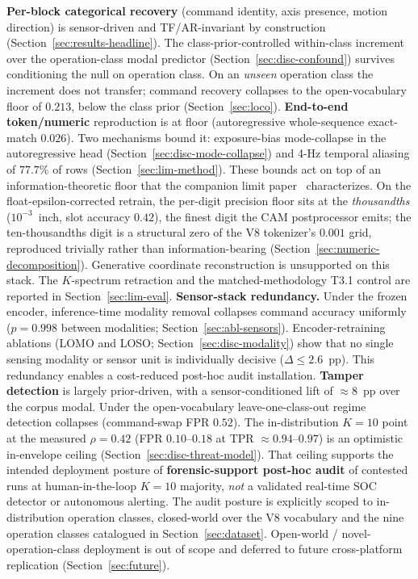 \documentclass[sensors,article,submit,moreauthors,pdftex]{Definitions/mdpi}
\begin{document}
\begin{enumerate}[label=(\arabic*), leftmargin=*, itemsep=2pt]\let\item\olditem
\item \textbf{Per-block categorical recovery} (command identity, axis presence, motion direction) is sensor-driven and TF/AR-invariant by construction (Section~\ref{sec:results-headline}). The class-prior-controlled within-class increment over the operation-class modal predictor (Section~\ref{sec:disc-confound}) survives conditioning the null on operation class. On an \emph{unseen} operation class the increment does not transfer; command recovery collapses to the open-vocabulary floor of $0.213$, below the class prior (Section~\ref{sec:loco}).
\item \textbf{End-to-end token/numeric} reproduction is at floor (autoregressive whole-sequence exact-match $0.026$). Two mechanisms bound it: exposure-bias mode-collapse in the autoregressive head (Section~\ref{sec:disc-mode-collapse}) and 4-Hz temporal aliasing of $77.7\%$ of rows (Section~\ref{sec:lim-method}). These bounds act on top of an information-theoretic floor that the companion limit paper~\cite{paperB_entropy} characterizes. On the float-epsilon-corrected retrain, the per-digit precision floor sits at the \emph{thousandths} ($10^{-3}$~inch, slot accuracy $0.42$), the finest digit the CAM postprocessor emits; the ten-thousandths digit is a structural zero of the V8 tokenizer's $0.001$ grid, reproduced trivially rather than information-bearing (Section~\ref{sec:numeric-decomposition}). Generative coordinate reconstruction is unsupported on this stack. The $K$-spectrum retraction and the matched-methodology T3.1 control are reported in Section~\ref{sec:lim-eval}.
\item \textbf{Sensor-stack redundancy.} Under the frozen encoder, inference-time modality removal collapses command accuracy uniformly ($p\!=\!0.998$ between modalities; Section~\ref{sec:abl-sensors}). Encoder-retraining ablations (LOMO and LOSO; Section~\ref{sec:disc-modality}) show that no single sensing modality or sensor unit is individually decisive ($\Delta\!\le\!2.6$~pp). This redundancy enables a cost-reduced post-hoc audit installation.
\item \textbf{Tamper detection} is largely prior-driven, with a sensor-conditioned lift of $\approx\!8$~pp over the corpus modal. Under the open-vocabulary leave-one-class-out regime detection collapses (command-swap FPR $0.52$). The in-distribution $K\!=\!10$ point at the measured $\rho\!=\!0.42$ (FPR $0.10$--$0.18$ at TPR $\approx\!0.94$--$0.97$) is an optimistic in-envelope ceiling (Section~\ref{sec:disc-threat-model}). That ceiling supports the intended deployment posture of \textbf{forensic-support post-hoc audit} of contested runs at human-in-the-loop $K\!=\!10$ majority, \emph{not} a validated real-time SOC detector or autonomous alerting. The audit posture is explicitly scoped to in-distribution operation classes, closed-world over the V8 vocabulary and the nine operation classes catalogued in Section~\ref{sec:dataset}. Open-world / novel-operation-class deployment is out of scope and deferred to future cross-platform replication (Section~\ref{sec:future}).
\end{enumerate}
\end{document}

